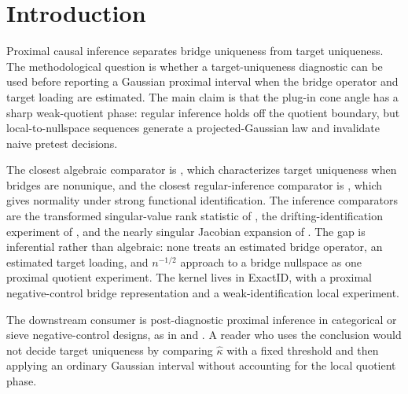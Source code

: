 \documentclass[11pt]{article}
\theoremstyle{definition}
\theoremstyle{plain}
\theoremstyle{remark}
\begin{document}
\section{Introduction}
Proximal causal inference separates bridge uniqueness from target uniqueness. The methodological question is whether a target-uniqueness diagnostic can be used before reporting a Gaussian proximal interval when the bridge operator and target loading are estimated. The main claim is that the plug-in cone angle has a sharp weak-quotient phase: regular inference holds off the quotient boundary, but local-to-nullspace sequences generate a projected-Gaussian law and invalidate naive pretest decisions.

The closest algebraic comparator is \citet[Sec. 2, Eq. (4)]{zhang2023proximalWithoutUniqueness}, which characterizes target uniqueness when bridges are nonunique, and the closest regular-inference comparator is \citet[Sec. 2, Thm. 1]{bennett2023stronglyIdentifiedFunctionals}, which gives normality under strong functional identification. The inference comparators are the transformed singular-value rank statistic of \citet[Sec. 2, Eq. (2.3)]{kleibergenPaap2006generalizedReducedRank}, the drifting-identification experiment of \citet[Sec. 2, Assumption A]{andrewsCheng2012weakSemiStrongStrong}, and the nearly singular Jacobian expansion of \citet[Sec. 2, Assumption 2.1]{hanMcCloskey2019nearlySingularJacobian}. The gap is inferential rather than algebraic: none treats an estimated bridge operator, an estimated target loading, and \(n^{-1/2}\) approach to a bridge nullspace as one proximal quotient experiment. The kernel lives in ExactID, with a proximal negative-control bridge representation and a weak-identification local experiment.

The downstream consumer is post-diagnostic proximal inference in categorical or sieve negative-control designs, as in \citet{shi2020multiplyRobustCategorical} and \citet{miao2024confoundingBridgeDoubleNegativeControl}. A reader who uses the conclusion would not decide target uniqueness by comparing \(\widehat\kappa\) with a fixed threshold and then applying an ordinary Gaussian interval without accounting for the local quotient phase.
\end{document}
